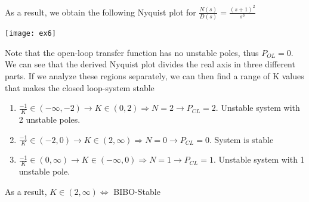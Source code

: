 \documentclass[twoside]{article}
\begin{document}
As a result, we obtain the following Nyquist plot for
$\frac{N(s)}{D(s)} = \frac{(s+1)^2}{s^3}$

\vspace{6 pt}

  \begin{minipage}[h]{1\linewidth}
    \begin{center}
      \texttt{[image: ex6]}
    \end{center}
  \end{minipage}

\vspace{6 pt}

Note that the open-loop transfer function has no unstable poles,
thus $P_{OL} = 0$. We can see that the derived Nyquist plot divides the real axis in
three different parts. If we analyze  these regions separately, we can 
then find a range of K values that makes the closed loop-system stable
%
\begin{enumerate}
  \item $\frac{-1}{K} \in (-\infty , - 2) \rightarrow K \in (0 , 2) \Rightarrow N = 2 \rightarrow P_{CL} = 2 $. Unstable system with
    2 unstable poles. 
  \item $\frac{-1}{K} \in (-2 , 0) \rightarrow K \in (2 , \infty)
    \Rightarrow N = 0 \rightarrow P_{CL} = 0 $. System is stable
    \item $\frac{-1}{K} \in (0,\infty) \rightarrow K \in (-\infty , 0)
    \Rightarrow N = 1 \rightarrow P_{CL} = 1 $. Unstable system with
    1 unstable pole. 
\end{enumerate}
%
As a result, $K \in (2 , \infty) \Leftrightarrow $ BIBO-Stable


\end{document}
